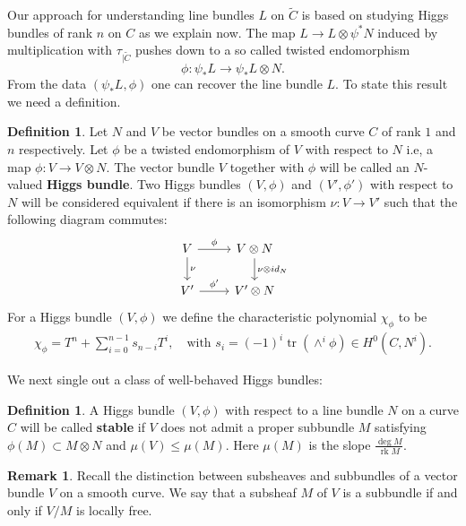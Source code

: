 \documentclass[12pt]{extarticle}
\theoremstyle{definition}
\newtheorem{definition}[theorem]{Definition}
\newtheorem{remark}[theorem]{Remark}
\numberwithin{theorem}{section}
\newcommand{\op}{\operatorname}
\renewcommand{\tilde}{\widetilde}		%
\begin{document}
Our approach for understanding line bundles $L$ on $\tilde{C}$ is based on studying Higgs bundles of rank $n$ on $C$ as we explain now. The map $L \to L \otimes \psi^*N$ induced by multiplication with $\tau_{|\tilde{C}}$ pushes down to a so called twisted endomorphism
\begin{equation*}
\phi: \psi_*L \to \psi_*L\otimes N.
\end{equation*}
From the data $(\psi_*L,\phi)$ one can recover the line bundle $L$. To state this result we need a definition. 
\begin{definition}
Let $N$ and $V$ be vector bundles on a smooth curve $C$ of rank $1$ and $n$ respectively. Let $\phi$ be a twisted endomorphism of $V$ with respect to $N$ i.e, a map $\phi: V \to V\otimes N$. The vector bundle $V$ together with $\phi$ will be called an $N$-valued \textbf{Higgs bundle}.  Two Higgs bundles $(V,\phi)$ and $(V',\phi')$ with respect to $N$ will be considered equivalent if there is an isomorphism $\nu: V \rightarrow V'$ such that the following diagram commutes:
\begin{equation*}
\begin{tikzcd}[ampersand replacement=\&]
	V \& {V\otimes N} \\
	{V'} \& {V'\otimes N}
	\arrow["\phi", from=1-1, to=1-2]
	\arrow["{\phi'}", from=2-1, to=2-2]
	\arrow["\nu", from=1-1, to=2-1]
	\arrow["{\nu\otimes id_{N}}", from=1-2, to=2-2]
\end{tikzcd}
\end{equation*}
For a Higgs bundle $(V,\phi)$ we define the characteristic polynomial $\chi_\phi$ to be
\begin{align*}
\chi_\phi  = T^n + \sum_{i=0}^{n-1} s_{n-i} T^i, \quad \text{with $s_i = (-1)^i\op{tr}\left(\wedge^i\phi\right) \in H^0(C,N^i)$.}
\end{align*}
\end{definition}
We next single out a class of well-behaved Higgs bundles:
\begin{definition}
A Higgs bundle $(V,\phi)$ with respect to a line bundle $N$ on a curve $C$ will be called \textbf{stable} if $V$ does not admit a proper subbundle $M$ satisfying $\phi(M) \subset
 M \otimes N$ and $\mu(V) \leq \mu(M)$. Here $\mu(M)$ is the slope $\frac{\deg M}{\op{rk}M}$.
\end{definition}
\begin{remark}
	Recall the distinction between subsheaves and subbundles of a vector bundle $V$ on a smooth curve. We say that a subsheaf $M$ of $V$ is a subbundle if and only if $V/M$ is locally free. 
\end{remark}
\end{document}
